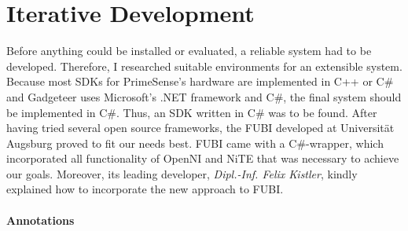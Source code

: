 
\section{Iterative Development}
\label{installation_testing}

Before anything could be installed or evaluated, a reliable system had to be developed. Therefore, I researched suitable environments for an extensible system. Because most \ac{SDK}s for PrimeSense's hardware are implemented in C++ or C$\#$ and Gadgeteer uses Microsoft's .NET framework and C$\#$, the final system should be implemented in C$\#$. Thus, an \ac{SDK} written in C$\#$ was to be found. After having tried several open source frameworks, the \ac{FUBI} developed at Universität Augsburg proved to fit our needs best. \ac{FUBI} came with a C$\#$-wrapper, which incorporated all functionality of OpenNI and NiTE that was necessary to achieve our goals. Moreover, its leading developer, \textit{Dipl.-Inf. Felix Kistler}, kindly explained how to incorporate the new approach to \ac{FUBI}.  

\paragraph{Annotations}

